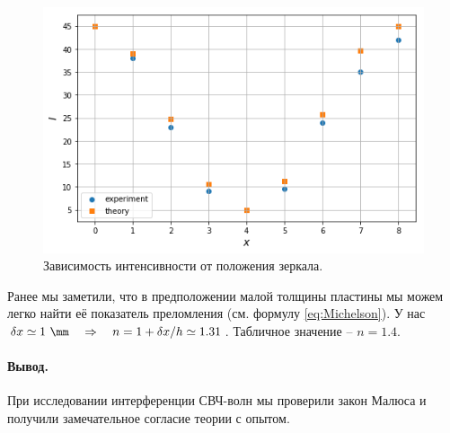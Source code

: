 \documentclass{../lab_class}
\begin{document}
\begin{figure}[H]
	\centering
	\includegraphics[width = 0.65 \textwidth]{pic04.png}
	\caption{Зависимость интенсивности от положения зеркала.}
\end{figure}

Ранее мы заметили, что в предположении малой толщины пластины мы можем легко найти её показатель преломления (см. формулу \ref{eq:Michelson}). У нас $\delta x \simeq 1 \ \mm \then n = 1 + \delta x / h \simeq 1.31$. Табличное значение -- $n = 1.4$.

\paragraph{Вывод.}
При исследовании интерференции СВЧ-волн мы проверили закон Малюса и получили замечательное согласие теории с опытом.
\end{document}
